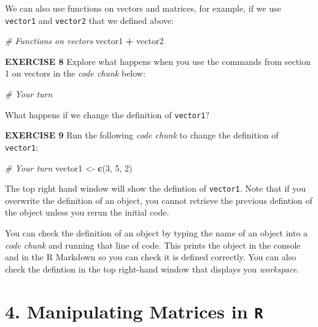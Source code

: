 \documentclass[
]{article}
\newenvironment{Shaded}{\begin{snugshade}}{\end{snugshade}}
\newcommand{\CommentTok}[1]{\textcolor[rgb]{0.56,0.35,0.01}{\textit{#1}}}
\newcommand{\DecValTok}[1]{\textcolor[rgb]{0.00,0.00,0.81}{#1}}
\newcommand{\KeywordTok}[1]{\textcolor[rgb]{0.13,0.29,0.53}{\textbf{#1}}}
\newcommand{\NormalTok}[1]{#1}
\newcommand{\OperatorTok}[1]{\textcolor[rgb]{0.81,0.36,0.00}{\textbf{#1}}}
\newcommand{\StringTok}[1]{\textcolor[rgb]{0.31,0.60,0.02}{#1}}
\begin{document}
We can also use functions on vectors and matrices, for example, if we
use \texttt{vector1} and \texttt{vector2} that we defined above:

\begin{Shaded}
\begin{Highlighting}[]
\CommentTok{# Functions on vectors}
\NormalTok{vector1 }\OperatorTok{+}\StringTok{ }\NormalTok{vector2}
\end{Highlighting}
\end{Shaded}

\textbf{EXERCISE 8} Explore what happens when you use the commands from
section 1 on vectors in the \emph{code chunk} below:

\begin{Shaded}
\begin{Highlighting}[]
\CommentTok{# Your turn}
\end{Highlighting}
\end{Shaded}

What happens if we change the definition of \texttt{vector1}?

\textbf{EXERCISE 9} Run the following \emph{code chunk} to change the
definition of \texttt{vector1}:

\begin{Shaded}
\begin{Highlighting}[]
\CommentTok{# Your turn}
\NormalTok{vector1 <-}\StringTok{ }\KeywordTok{c}\NormalTok{(}\DecValTok{3}\NormalTok{, }\DecValTok{5}\NormalTok{, }\DecValTok{2}\NormalTok{)}
\end{Highlighting}
\end{Shaded}

The top right hand window will show the defintion of \texttt{vector1}.
Note that if you overwrite the definition of an object, you cannot
retrieve the previous defintion of the object unless you rerun the
initial code.

You can check the definition of an object by typing the name of an
object into a \emph{code chunk} and running that line of code. This
prints the object in the console and in the R Markdown so you can check
it is defined correctly. You can also check the defintion in the top
right-hand window that displays you \emph{workspace}.

\hypertarget{manipulating-matrices-in-r}{%
\section{\texorpdfstring{4. Manipulating Matrices in
\texttt{R}}{4. Manipulating Matrices in R}}\label{manipulating-matrices-in-r}}
\end{document}
